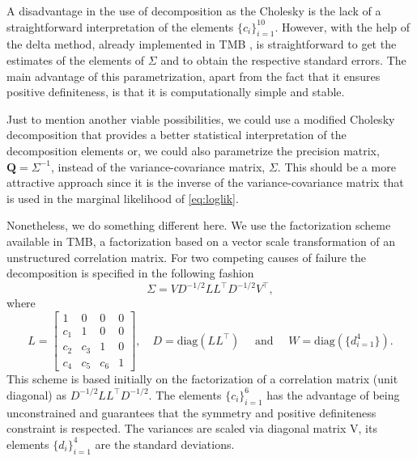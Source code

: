 A disadvantage in the use of decomposition as the Cholesky is the lack
of a straightforward interpretation of the elements
\(\{c_{i}\}_{i=1}^{10}\). However, with the help of the delta method,
already implemented in TMB \cite{TMB}, is straightforward to get the
estimates of the elements of \(\Sigma\) and to obtain the respective
standard errors. The main advantage of this parametrization, apart from
the fact that it ensures positive definiteness, is that it is
computationally simple and stable.

Just to mention another viable possibilities, we could use a modified
Cholesky decomposition \cite{modifiedcholesky} that provides a better
statistical interpretation of the decomposition elements or, we could
also parametrize the precision matrix, \(\bm{Q} = \Sigma^{-1}\), instead
of the variance-covariance matrix, \(\Sigma\). This should be a more
attractive approach since it is the inverse of the variance-covariance
matrix that is used in the marginal likelihood of \autoref{eq:loglik}.

Nonetheless, we do something different here. We use the factorization
scheme available in TMB, a factorization based on a vector scale
transformation of an unstructured correlation matrix. For two competing
causes of failure the decomposition is specified in the following
fashion
\[
  \Sigma = VD^{-1/2}LL^{\top}D^{-1/2}V^{\top},
\]
where
\[
  L =
  \begin{bmatrix}
    1&0&0&0\\
    c_{1}&1&0&0\\
    c_{2}&c_{3}&1&0\\
    c_{4}&c_{5}&c_{6}&1
  \end{bmatrix},\quad D = \text{diag}(LL^{\top})\quad
  \text{ and }\quad W = \text{diag}(\{d_{i=1}^{4}\}).
\]
This scheme is based initially on the factorization of a correlation
matrix (unit diagonal) as \(D^{-1/2}LL^{\top}D^{-1/2}\). The elements
\(\{c_{i}\}_{i=1}^{6}\) has the advantage of being unconstrained and
guarantees that the symmetry and positive definiteness constraint is
respected. The variances are scaled via diagonal matrix V, its elements
\(\{d_{i}\}_{i=1}^{4}\) are the standard deviations.

